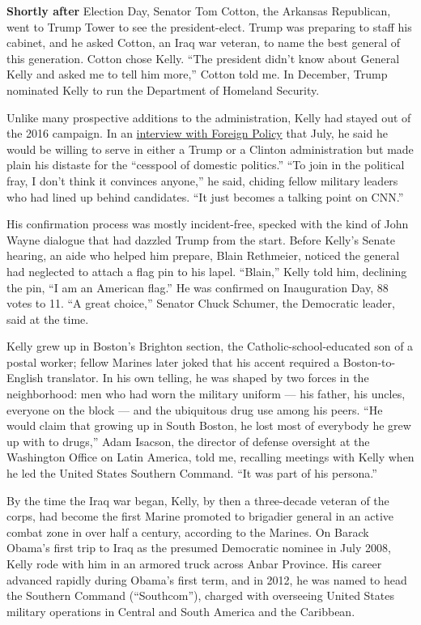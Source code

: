 \textbf{Shortly after} Election Day, Senator Tom Cotton, the Arkansas
Republican, went to Trump Tower to see the president-elect. Trump was
preparing to staff his cabinet, and he asked Cotton, an Iraq war
veteran, to name the best general of this generation. Cotton chose
Kelly. ``The president didn't know about General Kelly and asked me to
tell him more,'' Cotton told me. In December, Trump nominated Kelly to
run the Department of Homeland Security.

Unlike many prospective additions to the administration, Kelly had
stayed out of the 2016 campaign. In an
\href{http://foreignpolicy.com/2016/07/11/ex-general-to-top-brass-stay-out-of-the-cesspool-of-domestic-politics/}{interview
with Foreign Policy} that July, he said he would be willing to serve in
either a Trump or a Clinton administration but made plain his distaste
for the ``cesspool of domestic politics.'' ``To join in the political
fray, I don't think it convinces anyone,'' he said, chiding fellow
military leaders who had lined up behind candidates. ``It just becomes a
talking point on CNN.''

His confirmation process was mostly incident-free, specked with the kind
of John Wayne dialogue that had dazzled Trump from the start. Before
Kelly's Senate hearing, an aide who helped him prepare, Blain Rethmeier,
noticed the general had neglected to attach a flag pin to his lapel.
``Blain,'' Kelly told him, declining the pin, ``I am an American flag.''
He was confirmed on Inauguration Day, 88 votes to 11. ``A great
choice,'' Senator Chuck Schumer, the Democratic leader, said at the
time.

Kelly grew up in Boston's Brighton section, the Catholic-school-educated
son of a postal worker; fellow Marines later joked that his accent
required a Boston-to-English translator. In his own telling, he was
shaped by two forces in the neighborhood: men who had worn the military
uniform --- his father, his uncles, everyone on the block --- and the
ubiquitous drug use among his peers. ``He would claim that growing up in
South Boston, he lost most of everybody he grew up with to drugs,'' Adam
Isacson, the director of defense oversight at the Washington Office on
Latin America, told me, recalling meetings with Kelly when he led the
United States Southern Command. ``It was part of his persona.''

By the time the Iraq war began, Kelly, by then a three-decade veteran of
the corps, had become the first Marine promoted to brigadier general in
an active combat zone in over half a century, according to the Marines.
On Barack Obama's first trip to Iraq as the presumed Democratic nominee
in July 2008, Kelly rode with him in an armored truck across Anbar
Province. His career advanced rapidly during Obama's first term, and in
2012, he was named to head the Southern Command (``Southcom''), charged
with overseeing United States military operations in Central and South
America and the Caribbean.

